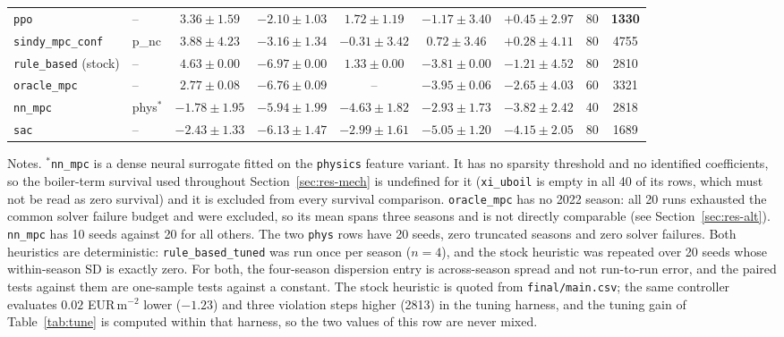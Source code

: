 \begin{table}[t]
\begin{tabular}{@{}llcccccrc@{}}
\texttt{ppo}                     & -- & $3.36\pm1.59$ & $-2.10\pm1.03$ & $1.72\pm1.19$ & $-1.17\pm3.40$& $+0.45\pm2.97$ & 80 & \textbf{1330} \\
\texttt{sindy\_mpc\_conf}        & p\_nc & $3.88\pm4.23$ & $-3.16\pm1.34$ & $-0.31\pm3.42$& $0.72\pm3.46$ & $+0.28\pm4.11$ & 80 & 4755 \\
\texttt{rule\_based} (stock)     & -- & $4.63\pm0.00$ & $-6.97\pm0.00$ & $1.33\pm0.00$ & $-3.81\pm0.00$& $-1.21\pm4.52$ & 80 & 2810 \\
\texttt{oracle\_mpc}             & -- & $2.77\pm0.08$ & $-6.76\pm0.09$ & -- & $-3.95\pm0.06$& $-2.65\pm4.03$ & 60 & 3321 \\
\texttt{nn\_mpc}                 & phys$^{*}$ & $-1.78\pm1.95$& $-5.94\pm1.99$ & $-4.63\pm1.82$& $-2.93\pm1.73$& $-3.82\pm2.42$ & 40 & 2818 \\
\texttt{sac}                     & -- & $-2.43\pm1.33$& $-6.13\pm1.47$ & $-2.99\pm1.61$& $-5.05\pm1.20$& $-4.15\pm2.05$ & 80 & 1689 \\
\bottomrule
\end{tabular}

\vspace{2pt}
\begin{minipage}{\linewidth}\scriptsize
Notes. $^{*}$\texttt{nn\_mpc} is a dense neural surrogate fitted on the \texttt{physics}
feature variant. It has no sparsity threshold and no identified coefficients, so the
boiler-term survival used throughout Section~\ref{sec:res-mech} is undefined for it
(\texttt{xi\_uboil} is empty in all 40 of its rows, which must not be read as zero
survival) and it is excluded from every survival comparison.
\texttt{oracle\_mpc} has no 2022 season: all 20 runs exhausted the common solver
failure budget and were excluded, so its mean spans three seasons and is not directly
comparable (see Section~\ref{sec:res-alt}). \texttt{nn\_mpc} has 10 seeds against 20 for
all others. The two \texttt{phys} rows have 20 seeds, zero truncated seasons and zero
solver failures. Both heuristics are deterministic: \texttt{rule\_based\_tuned} was run once per
season ($n=4$), and the stock heuristic was repeated over 20 seeds whose within-season SD
is exactly zero. For both, the four-season dispersion entry is across-season spread and
not run-to-run error, and the paired tests against them are one-sample tests against a
constant. The stock heuristic is quoted from \texttt{final/main.csv}; the same
controller evaluates $0.02$ EUR\,m$^{-2}$ lower ($-1.23$) and three violation steps higher
(2813) in the tuning harness, and the tuning gain of Table~\ref{tab:tune} is computed
within that harness, so the two values of this row are never mixed.
\end{minipage}
\end{table}


